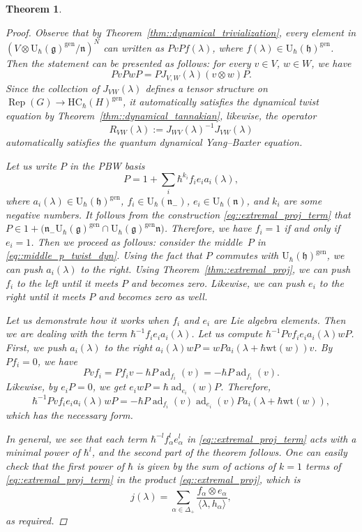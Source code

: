\documentclass[10pt,a4paper]{article}
\numberwithin{equation}{section}
\newtheorem{Theorem}{Theorem}[section]
\newcommand{\U}{\mathrm{U}_{\hbar}}
\newcommand{\g}{\mathfrak{g}}
\newcommand{\h}{\mathfrak{h}}
\newcommand{\n}{\mathfrak{n}}
\DeclareMathOperator{\ad}{ad}
\newcommand{\gen}{\mathrm{gen}}
\newcommand{\HC}{\mathrm{HC}_{\hbar}}
\DeclareMathOperator{\Rep}{Rep}
\newcommand{\wt}{\mathrm{wt}}
\begin{document}
\begin{Theorem}
\begin{proof}
			Observe that by Theorem~\ref{thm::dynamical_trivialization}, every element in $(V \otimes \U(\g)^{\gen} / \n)^{N}$ can written as $PvP f(\lambda)$, where $f(\lambda) \in \U(\h)^{\gen}$. Then the statement can be presented as follows: for every $v\in V$, $w\in W$, we have
			\begin{equation}
				\label{eq::middle_p_twist_dyn}
				Pv Pw P= PJ_{V,W}(\lambda) (v\otimes w) P.
			\end{equation}
			Since the collection of $J_{VW}(\lambda)$ defines a tensor structure on $\Rep(G) \rightarrow \HC(H)^{\gen}$, it automatically satisfies the dynamical twist equation by Theorem~\ref{thm::dynamical_tannakian}, likewise, the operator
			\[
				R_{VW}(\lambda) := J_{WV}(\lambda)^{-1} J_{VW}(\lambda)
			\]
			automatically satisfies the quantum dynamical Yang--Baxter equation.
			
			Let us write $P$ in the PBW basis
			\[
			P = 1 + \sum_i \hbar^{k_i} f_i e_i a_i(\lambda),
			\]
			where $a_i(\lambda) \in \U(\h)^{\gen}$, $f_i \in \U(\n_-)$, $e_i \in \U(\n)$, and $k_i$ are some negative numbers. It follows from the construction \eqref{eq::extremal_proj_term} that
$
			P\in 1 + \bigl(\n_- \U(\g)^{\gen} \cap \U(\g)^{\gen} \n\bigr)$.
			Therefore, we have $f_i =1$ if and only if $e_i=1$. Then we proceed as follows: consider the middle~$P$ in \eqref{eq::middle_p_twist_dyn}. Using the fact that $P$ commutes with $\U(\h)^{\gen}$, we can push $a_i(\lambda)$ to the right. Using Theorem~\ref{thm::extremal_proj}, we can push $f_i$ to the left until it meets $P$ and becomes zero. Likewise, we can push $e_i$ to the right until it meets $P$ and becomes zero as well.
			
			Let us demonstrate how it works when $f_i$ and $e_i$ are Lie algebra elements. Then we are dealing with the term $\hbar^{-1} f_i e_i a_i(\lambda)$. Let us compute $\hbar^{-1} Pv f_i e_i a_i(\lambda) wP$. First, we push $a_i(\lambda)$ to the right
$
			a_i(\lambda) w P = wPa_i(\lambda + \hbar \wt(w))v$.
			By $Pf_i = 0$, we have
			\[
			Pvf_i = Pf_i v - \hbar P\ad_{f_i}(v) = - \hbar P\ad_{f_i}(v).
			\]
			Likewise, by $e_i P = 0$, we get
			$
			e_i w P= \hbar \ad_{e_i}(w) P$.
			Therefore,
			\[
			\hbar^{-1} Pv f_i e_i a_i(\lambda) wP = -\hbar P \ad_{f_i}(v) \ad_{e_i}(v) P a_i(\lambda + \hbar \wt(w)),
			\]
			which has the necessary form.
			
			In general, we see that each term $\hbar^{-l}f_{\alpha}^l e_{\alpha}^l$ in \eqref{eq::extremal_proj_term} acts with a minimal power of $\hbar^l$, and the second part of the theorem follows. One can easily check that the first power of $\hbar$ is given by the sum of actions of $k=1$ terms of \eqref{eq::extremal_proj_term} in the product \eqref{eq::extremal_proj}, which is
			\[
			j(\lambda) = \sum\limits_{\alpha\in \Delta_+} \frac{f_{\alpha} \otimes e_{\alpha}}{\langle \lambda, h_{\alpha} \rangle },
			\]
			as required.
		\end{proof}
	\end{Theorem}
\end{document}
